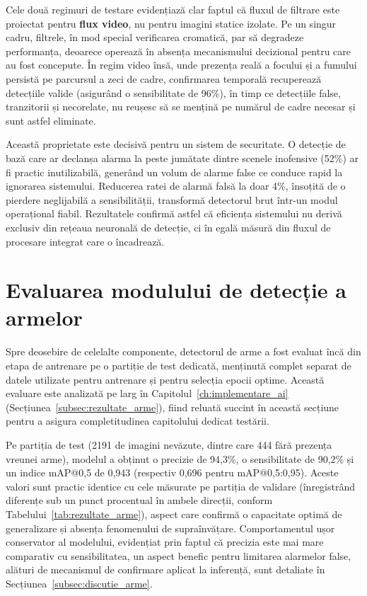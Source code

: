 \documentclass[../../main.tex]{subfiles}
\begin{document}
Cele două regimuri de testare evidențiază clar faptul că fluxul de filtrare este proiectat pentru \textbf{flux video}, nu pentru imagini statice izolate. Pe un singur cadru, filtrele, în mod special verificarea cromatică, par să degradeze performanța, deoarece operează în absența mecanismului decizional pentru care au fost concepute. În regim video însă, unde prezența reală a focului și a fumului persistă pe parcursul a zeci de cadre, confirmarea temporală recuperează detecțiile valide (asigurând o sensibilitate de 96\%), în timp ce detecțiile false, tranzitorii și necorelate, nu reușesc să se mențină pe numărul de cadre necesar și sunt astfel eliminate.

Această proprietate este decisivă pentru un sistem de securitate. O detecție de bază care ar declanșa alarma la peste jumătate dintre scenele inofensive (52\%) ar fi practic inutilizabilă, generând un volum de alarme false ce conduce rapid la ignorarea sistemului. Reducerea ratei de alarmă falsă la doar 4\%, însoțită de o pierdere neglijabilă a sensibilității, transformă detectorul brut într-un modul operațional fiabil. Rezultatele confirmă astfel că eficiența sistemului nu derivă exclusiv din rețeaua neuronală de detecție, ci în egală măsură din fluxul de procesare integrat care o încadrează.

\section{Evaluarea modulului de detecție a armelor}
\label{sec:eval_arme}

Spre deosebire de celelalte componente, detectorul de arme a fost evaluat încă din etapa de antrenare pe o partiție de test dedicată, menținută complet separat de datele utilizate pentru antrenare și pentru selecția epocii optime. Această evaluare este analizată pe larg în Capitolul~\ref{ch:implementare_ai} (Secțiunea~\ref{subsec:rezultate_arme}), fiind reluată succint în această secțiune pentru a asigura completitudinea capitolului dedicat testării.

Pe partiția de test (2191 de imagini nevăzute, dintre care 444 fără prezența vreunei arme), modelul a obținut o precizie de 94,3\%, o sensibilitate de 90,2\% și un indice mAP@0,5 de 0,943 (respectiv 0,696 pentru mAP@0,5:0,95). Aceste valori sunt practic identice cu cele măsurate pe partiția de validare (înregistrând diferențe sub un punct procentual în ambele direcții, conform Tabelului~\ref{tab:rezultate_arme}), aspect care confirmă o capacitate optimă de generalizare și absența fenomenului de supraînvățare. Comportamentul ușor conservator al modelului, evidențiat prin faptul că precizia este mai mare comparativ cu sensibilitatea, un aspect benefic pentru limitarea alarmelor false, alături de mecanismul de confirmare aplicat la inferență, sunt detaliate în Secțiunea~\ref{subsec:discutie_arme}.
\end{document}
